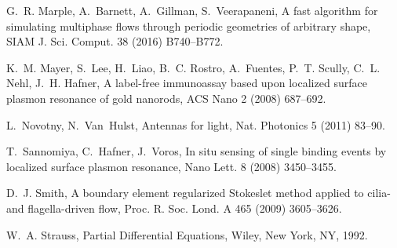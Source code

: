 \documentclass{article}[12pt]
\numberwithin{equation}{section}
\begin{document}
\begin{thebibliography}{10}
 G.~R. Marple, A.~Barnett, A.~Gillman,
  S.~Veerapaneni, A fast algorithm for simulating multiphase flows
  through periodic geometries of arbitrary shape, SIAM J.
  Sci. Comput. 38 (2016) B740--B772.

 K.~M. Mayer, S.~Lee, H.~Liao, B.~C. Rostro,
  A.~Fuentes, P.~T. Scully, C.~L.  Nehl, J.~H. Hafner, A label-free
  immunoassay based upon localized surface plasmon resonance of gold
  nanorods, ACS Nano 2 (2008) 687--692.

 L.~Novotny, N.~Van~Hulst, Antennas for
  light, Nat. Photonics 5 (2011) 83--90.

 T.~Sannomiya, C.~Hafner, J.~Voros, In situ
  sensing of single binding events by localized surface plasmon
  resonance, Nano Lett. 8 (2008) 3450--3455.

 D.~J. Smith, A boundary element
  regularized Stokeslet method applied to cilia-and flagella-driven
  flow, Proc. R. Soc. Lond. A 465 (2009) 3605--3626.

 W.~A. Strauss, Partial Differential
  Equations, Wiley, New York, NY, 1992.

\end{thebibliography}
\end{document}
